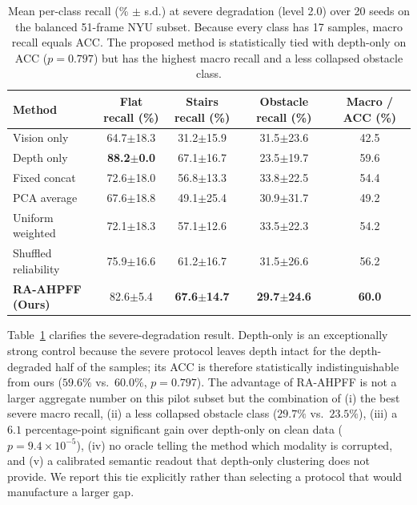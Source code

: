 \documentclass[11pt, a4paper]{article}
\begin{document}
\begin{table}[htbp]
    \centering
    \caption{Mean per-class recall (\% $\pm$ s.d.) at severe degradation (level 2.0) over 20 seeds on the balanced 51-frame NYU subset. Because every class has 17 samples, macro recall equals ACC. The proposed method is statistically tied with depth-only on ACC ($p=0.797$) but has the highest macro recall and a less collapsed obstacle class.}
    \label{tab:per_class_recall}
    \footnotesize
    \setlength{\tabcolsep}{4.0pt}
    \begin{tabularx}{\textwidth}{>{\raggedright\arraybackslash}X cccc}
        \toprule
        \textbf{Method} & \textbf{Flat recall (\%)} & \textbf{Stairs recall (\%)} & \textbf{Obstacle recall (\%)} & \textbf{Macro / ACC (\%)} \\
        \midrule
        Vision only & 64.7$\pm$18.3 & 31.2$\pm$15.9 & 31.5$\pm$23.6 & 42.5 \\
        Depth only & \textbf{88.2$\pm$0.0} & 67.1$\pm$16.7 & 23.5$\pm$19.7 & 59.6 \\
        Fixed concat & 72.6$\pm$18.0 & 56.8$\pm$13.3 & 33.8$\pm$22.5 & 54.4 \\
        PCA average & 67.6$\pm$18.8 & 49.1$\pm$25.4 & 30.9$\pm$31.7 & 49.2 \\
        Uniform weighted & 72.1$\pm$18.3 & 57.1$\pm$12.6 & 33.5$\pm$22.3 & 54.2 \\
        Shuffled reliability & 75.9$\pm$16.6 & 61.2$\pm$16.7 & 31.5$\pm$26.6 & 56.2 \\
        \textbf{RA-AHPFF (Ours)} & 82.6$\pm$5.4 & \textbf{67.6$\pm$14.7} & \textbf{29.7$\pm$24.6} & \textbf{60.0} \\
        \bottomrule
    \end{tabularx}
\end{table}

Table~\ref{tab:per_class_recall} clarifies the severe-degradation result. Depth-only is an exceptionally strong control because the severe protocol leaves depth intact for the depth-degraded half of the samples; its ACC is therefore statistically indistinguishable from ours ($59.6\%$ vs.\ $60.0\%$, $p=0.797$). The advantage of RA-AHPFF is not a larger aggregate number on this pilot subset but the combination of (i) the best severe macro recall, (ii) a less collapsed obstacle class ($29.7\%$ vs.\ $23.5\%$), (iii) a $6.1$ percentage-point significant gain over depth-only on clean data ($p=9.4\times10^{-5}$), (iv) no oracle telling the method which modality is corrupted, and (v) a calibrated semantic readout that depth-only clustering does not provide. We report this tie explicitly rather than selecting a protocol that would manufacture a larger gap.
\end{document}
